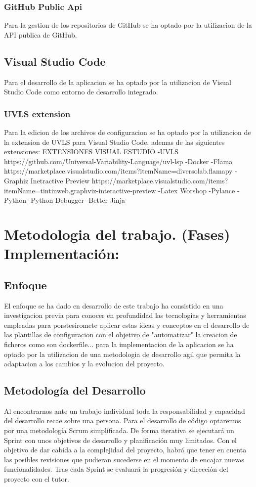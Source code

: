 \documentclass[12pt, a4paper, twoside]{article}
\begin{document}
\subsubsection{GitHub Public Api}
Para la gestion de los repositorios de GitHub se ha optado por la utilizacion de la API publica de GitHub.
\blindtext

\subsection{Visual Studio Code}
Para el desarrollo de la aplicacion se ha optado por la utilizacion de Visual Studio Code como entorno de desarrollo integrado.
\subsubsection{UVLS extension}
Para la edicion de los archivos de configuracion se ha optado por la utilizacion de la extension de UVLS para Visual Studio Code.
ademas de las siguientes extensiones:
EXTENSIONES VISUAL ESTUDIO
	-UVLS https://github.com/Universal-Variability-Language/uvl-lsp
	-Docker
	-Flama https://marketplace.visualstudio.com/items?itemName=diversolab.flamapy
	-Graphiz Inetractive Preview https://marketplace.visualstudio.com/items?itemName=tintinweb.graphviz-interactive-preview
	-Latex Worshop
	-Pylance
	-Python
	-Python Debugger
	-Better Jinja






\section{Metodologia del trabajo. (Fases) Implementación:}
\subsection{Enfoque}
El enfoque se ha dado en desarrollo de este trabajo ha consistido en una investigacion previa para conocer en profundidad las tecnologias y herramientas empleadas
para porstesiromete aplicar estas ideas y conceptos en el desarrollo de las plantillas de configuracion con el objetivo de "automatizar" la creacion de ficheros como son dockerfile...
para la implementacion de la aplicacion se ha optado por la utilizacion de una metodologia de desarrollo agil que permita la adaptacion a los cambios y la evolucion del proyecto.
\subsection{Metodología del Desarrollo}
Al encontrarnos ante un trabajo individual toda la responsabilidad y capacidad del desarrollo recae sobre una persona. 
Para el desarrollo de código optaremos por una metodología Scrum simplificada. De forma iterativa se ejecutará un Sprint con 
unos objetivos de desarrollo y planificación muy limitados. Con el objetivo de dar cabida a la complejidad del proyecto, habrá 
que tener en cuenta las posibles revisiones que pudieran sucederse en el momento de encajar nuevas funcionalidades. 
Tras cada Sprint se evaluará la progresión y dirección del proyecto con el tutor. 
\end{document}
